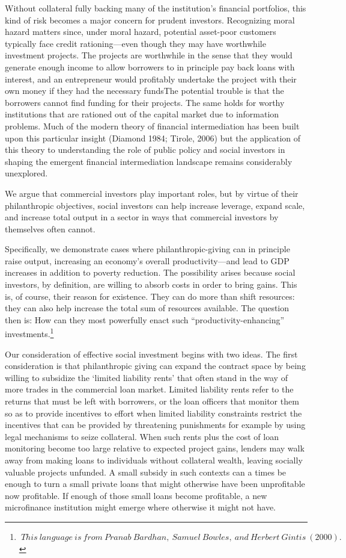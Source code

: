 \documentclass{article} %
\begin{document}
Without collateral fully backing many of the institution's financial portfolios, this kind of risk becomes a major concern for prudent investors. Recognizing moral hazard matters since, under moral hazard, potential asset-poor customers typically face credit rationing---even though they may have worthwhile investment projects. The projects are worthwhile in the sense that they would generate enough income to allow borrowers to in principle pay back loans with interest, and an entrepreneur would profitably undertake the project with their own money if they had the necessary fundsThe potential trouble is that the borrowers cannot find funding for their projects. The same holds for worthy institutions that are rationed out of the capital market due to information problems.  Much of the modern theory of financial intermediation has been built upon this particular insight (Diamond 1984; Tirole, 2006) but the application of this theory to understanding the role of public policy and social investors in shaping the emergent financial intermediation landscape remains considerably unexplored. 

We argue that commercial investors play important roles, but by virtue of their philanthropic objectives, social investors can help increase leverage, expand scale, and increase total output in a sector in ways that commercial investors by themselves often cannot. 

Specifically, we demonstrate cases where philanthropic-giving can in principle raise output, increasing an economy's overall productivity---and lead to GDP increases in addition to poverty reduction. The possibility arises because social investors, by definition, are willing to absorb costs in order to bring gains. This is, of course, their reason for existence. They can do more than shift resources: they can also help increase the total sum of resources available. The question then is: How can they most powerfully enact such ``productivity-enhancing'' investments.\footnote{ $\ This\ language\ is\ from\ Pranab\ Bardhan,\ Samuel\ Bowles,\ and\ Herbert\ Gintis\ (2000).$ } 

Our consideration of effective social investment begins with two ideas. The first consideration is that philanthropic giving can expand the contract space by being willing to subsidize the `limited liability rents' that often stand in the way of more trades in the commercial loan market.  Limited liability rents refer to the returns that must be left with borrowers, or the loan officers that monitor them so as to provide incentives to effort when limited liability constraints restrict the incentives that can be provided by threatening punishments for example by using legal mechanisms to seize collateral. When such rents plus the cost of loan monitoring become too large relative to expected project gains, lenders may walk away from making loans to individuals without collateral wealth, leaving socially valuable projects unfunded.  A small subsidy in such contexts can a times be enough to turn a small private loans that might otherwise have been unprofitable now profitable. If enough of those small loans become profitable, a new microfinance institution might emerge where otherwise it might not have. 
\end{document}
